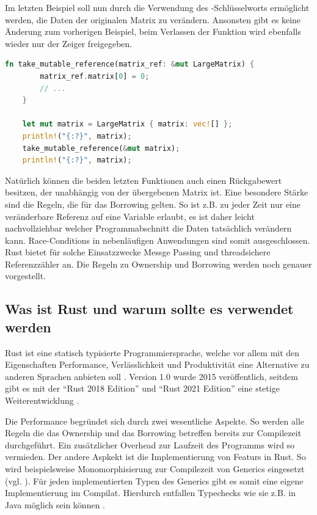 \documentclass[11pt,a4paper, ngerman]{article}
\begin{document}
Im letzten Beispiel soll nun durch die Verwendung des -Schlüsselworts ermöglicht werden, die Daten der originalen Matrix zu verändern. Ansonsten gibt es keine Änderung zum vorherigen Beispiel, beim Verlassen der Funktion wird ebenfalls wieder nur der Zeiger freigegeben.

\begin{lstlisting}[language=rust, caption={Einführendes Beispiel: Veränderliche Referenz}]
    fn take_mutable_reference(matrix_ref: &mut LargeMatrix) {
        matrix_ref.matrix[0] = 0;
        // ...
    }

    let mut matrix = LargeMatrix { matrix: vec![] };
    println!("{:?}", matrix);
    take_mutable_reference(&mut matrix);
    println!("{:?}", matrix);
\end{lstlisting}

Natürlich können die beiden letzten Funktionen auch einen Rückgabewert besitzen, der unabhängig von der übergebenen Matrix ist. Eine besondere Stärke sind die Regeln, die für das Borrowing gelten. So ist z.B. zu jeder Zeit nur eine veränderbare Referenz auf eine Variable erlaubt, es ist daher leicht nachvollziehbar welcher Programmabschnitt die Daten tatsächlich verändern kann. Race-Conditions in nebenläufigen Anwendungen sind somit ausgeschlossen. Rust bietet für solche Einsatzzwecke Messge Passing \cite{K1727} und threadsichere Referenzzähler \cite{ArcSrc} an. Die Regeln zu Ownership und Borrowing werden noch genauer vorgestellt.

\label{sec:kap2d2}
\subsection{Was ist Rust und warum sollte es verwendet werden}
Rust ist eine statisch typisierte Programmiersprache, welche vor allem mit den Eigenschaften Performance, Verlässlichkeit und Produktivität eine Alternative zu anderen Sprachen anbieten soll \cite{RustPromises}. Version 1.0 wurde 2015 veröffentlich, seitdem gibt es mit der ``Rust 2018 Edition'' und ``Rust 2021 Edition'' eine stetige Weiterentwicklung \cite{RustEditions}.

Die Performance begründet sich durch zwei wesentliche Aspekte. So werden alle Regeln die das Ownership und das Borrowing betreffen bereits zur Compilezeit durchgeführt. Ein zusätzlicher Overhead zur Laufzeit des Programms wird so vermieden. Der andere Aspkekt ist die Implementierung von Featurs in Rust. So wird beispielsweise Monomorphisierung zur Compilezeit von Generics eingesetzt (vgl. \cite[S. 196 ff.]{SK19}). Für jeden implementierten Typen des Generics gibt es somit eine eigene Implementierung im Compilat. Hierdurch entfallen Typechecks wie sie z.B. in Java möglich sein können \cite{JavaGenerics}.
\end{document}
